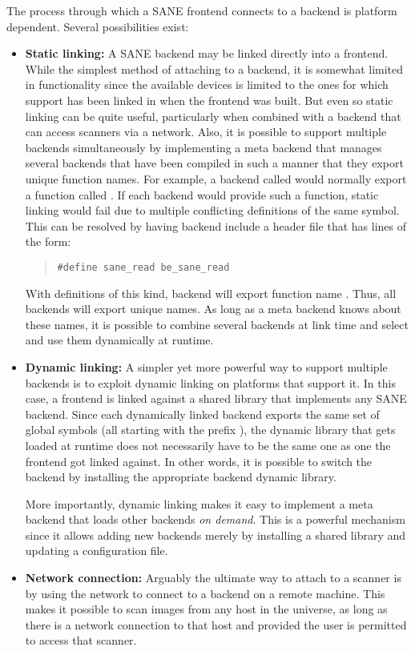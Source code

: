 \documentclass[11pt,DVIps]{report}
\begin{document}
The process through which a SANE frontend connects to a backend is
platform dependent.  Several possibilities exist:
\begin{itemize}

\item {\bf Static linking:} A SANE backend may be linked directly into
  a frontend.  While the simplest method of attaching to a backend, it
  is somewhat limited in functionality since the available devices is
  limited to the ones for which support has been linked in when the
  frontend was built.  But even so static linking can be quite useful,
  particularly when combined with a backend that can access scanners
  via a network.  Also, it is possible to support multiple backends
  simultaneously by implementing a meta backend that manages several
  backends that have been compiled in such a manner that they export
  unique function names.  For example, a backend called 
  would normally export a function called .  If
  each backend would provide such a function, static linking would
  fail due to multiple conflicting definitions of the same symbol.
  This can be resolved by having backend  include a
  header file that has lines of the form:
  \begin{quote}
\begin{verbatim}
#define sane_read be_sane_read
\end{verbatim}
  \end{quote}
  With definitions of this kind, backend  will export
  function name .  Thus, all backends will
  export unique names.  As long as a meta backend knows about these
  names, it is possible to combine several backends at link time and
  select and use them dynamically at runtime.

\item {\bf Dynamic linking:} A simpler yet more powerful way to
  support multiple backends is to exploit dynamic linking on platforms
  that support it.  In this case, a frontend is linked against a
  shared library that implements any SANE backend.  Since each
  dynamically linked backend exports the same set of global symbols
  (all starting with the prefix ), the dynamic library
  that gets loaded at runtime does not necessarily have to be the same
  one as one the frontend got linked against.  In other words, it is
  possible to switch the backend by installing the appropriate backend
  dynamic library.

  More importantly, dynamic linking makes it easy to implement a meta
  backend that loads other backends {\em on demand}.  This is a
  powerful mechanism since it allows adding new backends merely by
  installing a shared library and updating a configuration file.

\item {\bf Network connection:} Arguably the ultimate way to attach to
  a scanner is by using the network to connect to a backend on a
  remote machine.  This makes it possible to scan images from any host
  in the universe, as long as there is a network connection to that
  host and provided the user is permitted to access that scanner.

\end{itemize}
\end{document}
